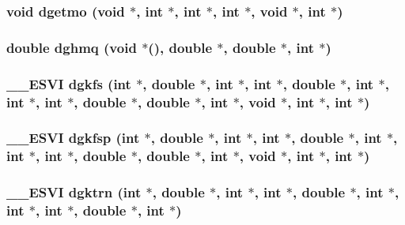 \subsubsection{\setlength{\rightskip}{0pt plus 5cm}void dgetmo (void $\ast$, int $\ast$, int $\ast$, int $\ast$, void $\ast$, int $\ast$)}\label{essl_8h_bbd779d27ee1b64fbbc88680e7a589c3}


\subsubsection{\setlength{\rightskip}{0pt plus 5cm}double dghmq (void $\ast$(), double $\ast$, double $\ast$, int $\ast$)}\label{essl_8h_bc356ce18bf663ff3704c04665c5508c}


\subsubsection{\setlength{\rightskip}{0pt plus 5cm}\_\-\_\-ESVI dgkfs (int $\ast$, double $\ast$, int $\ast$, int $\ast$, double $\ast$, int $\ast$, int $\ast$, int $\ast$, double $\ast$, double $\ast$, int $\ast$, void $\ast$, int $\ast$, int $\ast$)}\label{essl_8h_12d7765ef02d71b07fcdc50feff2ee9a}


\subsubsection{\setlength{\rightskip}{0pt plus 5cm}\_\-\_\-ESVI dgkfsp (int $\ast$, double $\ast$, int $\ast$, int $\ast$, double $\ast$, int $\ast$, int $\ast$, int $\ast$, double $\ast$, double $\ast$, int $\ast$, void $\ast$, int $\ast$, int $\ast$)}\label{essl_8h_5d17d03a192338d06031e39c804fed4c}


\subsubsection{\setlength{\rightskip}{0pt plus 5cm}\_\-\_\-ESVI dgktrn (int $\ast$, double $\ast$, int $\ast$, int $\ast$, double $\ast$, int $\ast$, int $\ast$, int $\ast$, double $\ast$, int $\ast$)}\label{essl_8h_ef03e0cb15dfcc3cc69482d55926e2fe}


